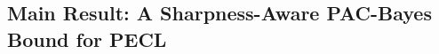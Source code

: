 \documentclass{article} %
\newtheorem{lemma}{Lemma}
\begin{document}











\subsection{Main Result: A Sharpness-Aware PAC-Bayes Bound for PECL}
\end{document}
